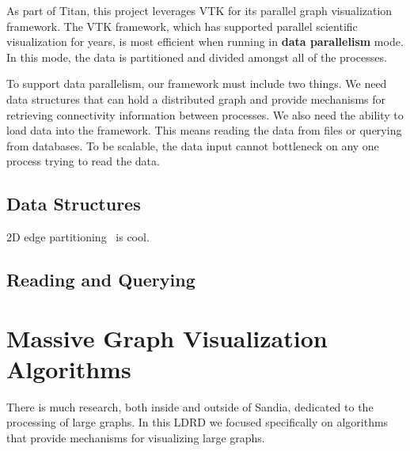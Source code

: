 \documentclass[pdf,12pt,report,strict]{SANDreport}
\newcommand*{\lcite}[1]{~\cite{#1}}
\newcommand{\titan}{Titan\index{Titan}\xspace}
\newcommand*{\keyterm}[1]{\textbf{#1}}
\begin{document}
As part of \titan, this project leverages VTK for its parallel
graph visualization framework.  The VTK framework, which has supported
parallel scientific visualization for years, is most efficient when running
in \keyterm{data parallelism} mode.  In this mode, the
data is partitioned and divided amongst all of the processes.

To support data parallelism, our framework must include two things.  We
need data structures that can hold a distributed graph and provide
mechanisms for retrieving connectivity information between processes.  We
also need the ability to load data into the framework.  This means reading
the data from files or querying from databases.  To be scalable, the data
input cannot bottleneck on any one process trying to read the data.

\section{Data Structures}
\label{sec:ParallelGraphVisualizationFramework:DataStructures}



2D edge partitioning\lcite{Yoo05} is cool.


\section{Reading and Querying}
\label{sec:ParallelGraphVisualizationFramework:ReadingAndQuerying}


\chapter{Massive Graph Visualization Algorithms}
\label{chap:MassiveGraphVisualizationAlgorithms}

There is much research, both inside and outside of Sandia, dedicated to the
processing of large graphs.  In this LDRD we focused specifically on
algorithms that provide mechanisms for visualizing large graphs.
\end{document}
